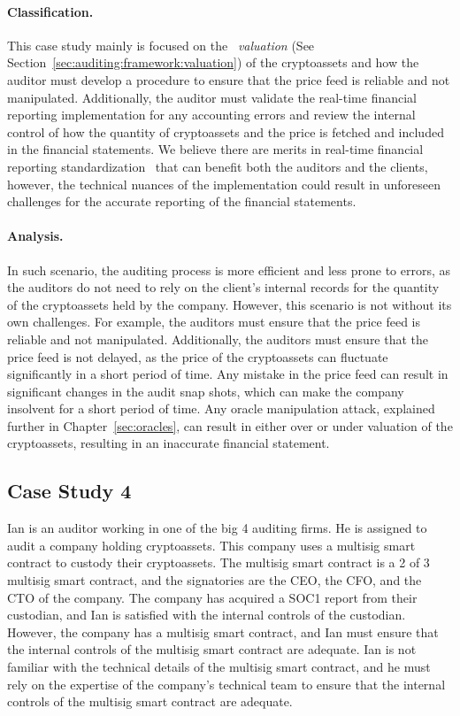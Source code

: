 \paragraph{Classification.} This case study mainly is focused on the ~\textit{valuation} (See Section~\ref{sec:auditing:framework:valuation}) of the cryptoassets and how the auditor must develop a procedure to ensure that the price feed is reliable and not manipulated. Additionally, the auditor must validate the real-time financial reporting implementation for any accounting errors and review the internal control of how the quantity of cryptoassets and the price is fetched and included in the financial statements. We believe there are merits in real-time financial reporting standardization~\cite{bakarich2020use,yu2018blockchain} that can benefit both the auditors and the clients, however, the technical nuances of the implementation could result in unforeseen challenges for the accurate reporting of the financial statements.


\paragraph{Analysis.} In such scenario, the auditing process is more efficient and less prone to errors, as the auditors do not need to rely on the client's internal records for the quantity of the cryptoassets held by the company. However, this scenario is not without its own challenges. For example, the auditors must ensure that the price feed is reliable and not manipulated. Additionally, the auditors must ensure that the price feed is not delayed, as the price of the cryptoassets can fluctuate significantly in a short period of time. Any mistake in the price feed can result in significant changes in the audit snap shots, which can make the company insolvent for a short period of time. Any oracle manipulation attack, explained further in Chapter~\ref{sec:oracles}, can result in either over or under valuation of the cryptoassets, resulting in an inaccurate financial statement.




\subsection{Case Study 4} \label{sec:auditing:case-studies:internalcontrol} %
Ian is an auditor working in one of the big 4 auditing firms. He is assigned to audit a company holding cryptoassets. This company uses a multisig smart contract to custody their cryptoassets. The multisig smart contract is a 2 of 3 multisig smart contract, and the signatories are the CEO, the CFO, and the CTO of the company. The company has acquired a SOC1 report from their custodian, and Ian is satisfied with the internal controls of the custodian. However, the company has a multisig smart contract, and Ian must ensure that the internal controls of the multisig smart contract are adequate. Ian is not familiar with the technical details of the multisig smart contract, and he must rely on the expertise of the company's technical team to ensure that the internal controls of the multisig smart contract are adequate.

